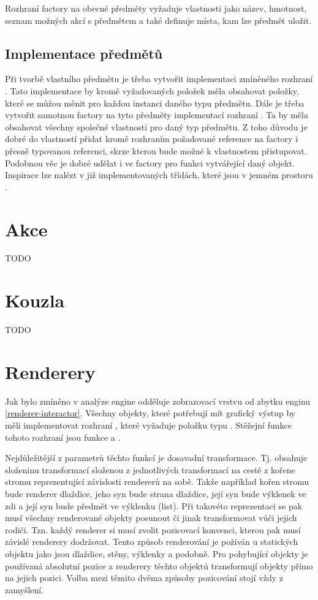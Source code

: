 Rozhraní factory na obecné předměty vyžaduje vlastnosti jako název, hmotnost, seznam 
možných akcí s předmětem a také definuje místa, kam lze předmět uložit.

\subsection{Implementace předmětů}
Při tvorbě vlastního předmětu je třeba vytvořit implementaci zmíněného rozhraní . Tato implementace by 
kromě vyžadovaných položek měla obsahovat položky, které se můžou měnit pro každou instanci daného typu předmětu. 
Dále je třeba vytvořit samotnou factory na tyto předměty implementací rozhraní .
Ta by měla obsahovat všechny společné vlastnosti pro daný typ předmětu. Z toho  důvodu je dobré do vlastností 
přidat kromě rozhraním požadované reference na factory i přesně typovanou referenci, skrze kterou bude možné k 
vlastnostem přistupovat. Podobnou věc je dobré udělat i ve factory pro funkci vytvářející daný objekt. Inspirace
lze nalézt v již implementovaných třídách, které jsou v jemném prostoru .

\section{Akce}
TODO
\section{Kouzla}
TODO

\section{Renderery}
Jak bylo zmíněno v analýze engine odděluje zobrazovací vrstvu od zbytku enginu \vref{renderer-interactor}. Všechny objekty,
které potřebují mít grafický výstup by měli implementovat rozhraní , které vyžaduje položku typu . 
Stěžejní funkce tohoto rozhraní jsou funkce  a . 

Nejdůležitější z parametrů těchto funkcí je dosavadní transformace. Tj. obsahuje složeninu transformací složenou z jednotlivých
transformací na cestě z kořene stromu reprezentující závislosti rendererů na sobě. Takže například kořen stromu bude renderer
dlaždice, jeho syn bude strana dlaždice, její syn bude výklenek ve zdi a její syn bude předmět ve
výklenku (list). Při takovéto reprezentaci se pak musí všechny renderované objekty posunout či jinak transformovat vůči jejich rodiči.
Tzn. každý renderer si musí zvolit pozicovací konvenci, kterou pak musí závislé renderery dodržovat. Tento způsob renderování je požíván u statických objektu jako
jsou dlaždice, stěny, výklenky a podobně. Pro pohybující objekty je používaná absolutní pozice a renderery
těchto objektů transformují objekty přímo na jejich pozici. Volba mezi těmito dvěma způsoby pozicování stojí vždy z zamyšlení.

